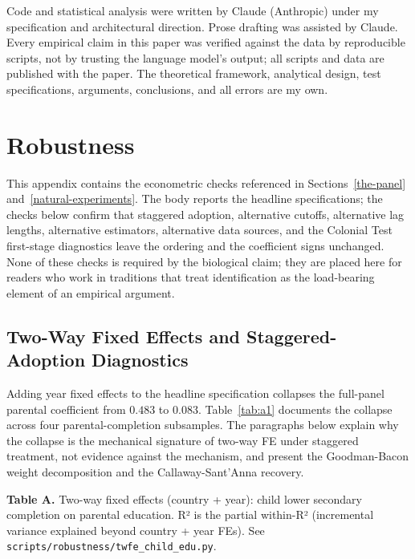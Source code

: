 \documentclass[12pt,letterpaper]{article}
\begin{document}
Code and statistical analysis were written by Claude (Anthropic)
under my specification and architectural direction. Prose drafting was
assisted by Claude. Every empirical claim in this paper was verified
against the data by reproducible scripts, not by trusting the language
model's output; all scripts and data are published with the paper. The
theoretical framework, analytical design, test specifications,
arguments, conclusions, and all errors are my own.


\appendix

\section{Robustness}\label{appendix-robustness}

{\renewcommand{\thetable}{A\arabic{table}}%
\setcounter{table}{0}

This appendix contains the econometric checks referenced in
Sections~\ref{the-panel} and~\ref{natural-experiments}. The body
reports the headline specifications; the checks below confirm that
staggered adoption, alternative cutoffs, alternative lag lengths,
alternative estimators, alternative data sources, and the Colonial
Test first-stage diagnostics leave the ordering and the coefficient
signs unchanged. None of these checks is required by the biological
claim; they are placed here for readers who work in traditions that
treat identification as the load-bearing element of an empirical
argument.

\subsection{Two-Way Fixed Effects and Staggered-Adoption Diagnostics}\label{appendix-twfe}

\noindent Adding year fixed effects to the headline specification
collapses the full-panel parental coefficient from $0.483$ to
$0.083$. Table~\ref{tab:a1} documents the collapse across four
parental-completion subsamples. The paragraphs below explain why the
collapse is the mechanical signature of two-way FE under staggered
treatment, not evidence against the mechanism, and present the
Goodman-Bacon weight decomposition and the Callaway-Sant'Anna
recovery.

\label{tab:a1}\textbf{Table \thetable.} Two-way fixed effects (country + year): child lower
secondary completion on parental education. R² is the partial within-R²
(incremental variance explained beyond country + year FEs). See
\texttt{scripts/robustness/twfe\_child\_edu.py}.

}
\end{document}
